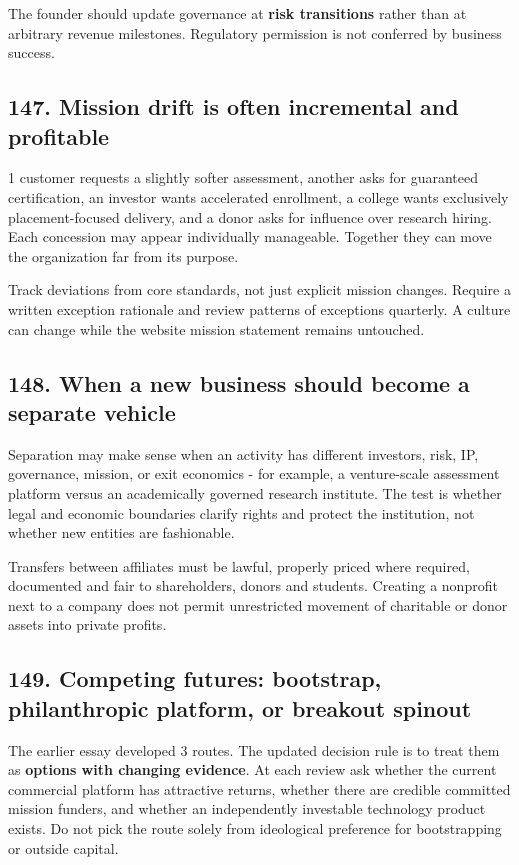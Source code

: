The founder should update governance at \textbf{risk transitions} rather than at arbitrary revenue milestones. Regulatory permission is not conferred by business success.

\subsection{147. Mission drift is often incremental and profitable}

1 customer requests a slightly softer assessment, another asks for guaranteed certification, an investor wants accelerated enrollment, a college wants exclusively placement-focused delivery, and a donor asks for influence over research hiring. Each concession may appear individually manageable. Together they can move the organization far from its purpose.

Track deviations from core standards, not just explicit mission changes. Require a written exception rationale and review patterns of exceptions quarterly. A culture can change while the website mission statement remains untouched.

\subsection{148. When a new business should become a separate vehicle}

Separation may make sense when an activity has different investors, risk, IP, governance, mission, or exit economics - for example, a venture-scale assessment platform versus an academically governed research institute. The test is whether legal and economic boundaries clarify rights and protect the institution, not whether new entities are fashionable.

Transfers between affiliates must be lawful, properly priced where required, documented and fair to shareholders, donors and students. Creating a nonprofit next to a company does not permit unrestricted movement of charitable or donor assets into private profits.

\subsection{149. Competing futures: bootstrap, philanthropic platform, or breakout spinout}

The earlier essay developed 3 routes. The updated decision rule is to treat them as \textbf{options with changing evidence}. At each review ask whether the current commercial platform has attractive returns, whether there are credible committed mission funders, and whether an independently investable technology product exists. Do not pick the route solely from ideological preference for bootstrapping or outside capital.

